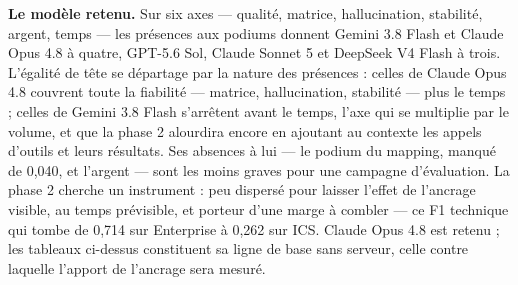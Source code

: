 \textbf{Le modèle retenu.} Sur six axes --- qualité, matrice, hallucination, stabilité, argent, temps --- les présences aux podiums donnent Gemini 3.8 Flash et Claude Opus 4.8 à quatre, GPT-5.6 Sol, Claude Sonnet 5 et DeepSeek V4 Flash à trois. L'égalité de tête se départage par la nature des présences : celles de Claude Opus 4.8 couvrent toute la fiabilité --- matrice, hallucination, stabilité --- plus le temps ; celles de Gemini 3.8 Flash s'arrêtent avant le temps, l'axe qui se multiplie par le volume, et que la phase 2 alourdira encore en ajoutant au contexte les appels d'outils et leurs résultats. Ses absences à lui --- le podium du mapping, manqué de 0,040, et l'argent --- sont les moins graves pour une campagne d'évaluation. La phase 2 cherche un instrument : peu dispersé pour laisser l'effet de l'ancrage visible, au temps prévisible, et porteur d'une marge à combler --- ce F1 technique qui tombe de 0,714 sur Enterprise à 0,262 sur ICS. Claude Opus 4.8 est retenu ; les tableaux ci-dessus constituent sa ligne de base sans serveur, celle contre laquelle l'apport de l'ancrage sera mesuré.


\fi
\FloatBarrier

